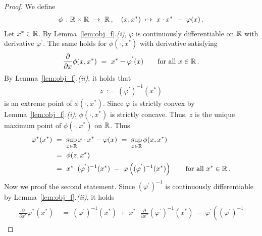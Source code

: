 \begin{proof}
We define
\begin{gather*}
 \phi
 \ 
 \colon
 \R
 \times
 \R
 \ 
 \to
 \ 
 \R
 \,,
 \quad
 (x,x^*)
 \ 
 \mapsto
 \ 
 x\cdot x^*
 \ 
 -
 \ 
 \varphi(x)
 \,.
\end{gather*}
Let $x^*\in\mathbb{R}$.
By Lemma~\ref{lem:obj_f}.\textit{(i)},
      $\varphi$ is continuously differentiable on $\mathbb{R}$ with derivative $\varphi^{'}$.
      The same holds for $\phi(\cdot,x^*)$ with derivative
      satisfying 
      \begin{gather*}
        \frac{\partial}{\partial x}
        \phi(x,x^*)
        \ 
        =
 \ 
        x^*
        -
        \varphi^{'}(x)
        \qquad
        \text{for all}\ 
        x\in\R
        \,.
      \end{gather*}
      By Lemma~\ref{lem:obj_f}.\textit{(ii)},
  it holds that 
  \begin{gather*}
    z
    \ 
    :=
    \ 
      (
    \varphi^{'}
    )^{-1}
    (x^*)
  \end{gather*}
  is an extreme point of $\phi(\cdot,x^*)$.
  Since $\varphi$ is strictly convex by Lemma~\ref{lem:obj_f}.\textit{(i)}, 
  $\phi(\cdot,x^*)$
  is strictly concave. 
  Thus,
  $z$ is the unique maximum point
  of
  $\phi(\cdot,x^*)$
  on $\mathbb{R}$.
  Thus
  \begin{align*}
    \varphi^*(x^*)
    &
    \ 
    =
    \ 
    \sup_{x\in\R}
    x\cdot x^* - \varphi(x)
    \ 
    =
    \ 
    \sup_{x\in\R}
    \phi(x,x^*)
    \\
    &
    \ 
    =
    \ 
    \phi(z,x^*)
    \\
    &
    \ 
    =
    \ 
    x^*
    \!
    \cdot
    (
    \varphi^{'}
    )^{-1}
    (x^*)
    \ 
    -
    \ 
    \varphi
    \left( 
      (
    \varphi^{'}
    )^{-1}
    (x^*)
    \right)
    \qquad 
    \text{for all}\ 
    x^*\in\R
    \,.
  \end{align*}
  Now we proof the second statement.
  Since
  $
      (
    \varphi^{'}
    )^{-1}
  $
  is continuously differentiable by Lemma~\ref{lem:obj_f}.\textit{(ii)}, it holds
  \begin{align}
    \label{0098}
    \begin{split}
    \frac{\partial}{\partial x^*}
     \varphi^*(x^*)
    &
    \ 
    =
    \ 
    (
    \varphi^{'}
    )^{-1}
    (x^*)
    \ 
    +
    \ 
    x^*
    \!
    \cdot
    \frac{\partial}{\partial x^*}
    (
    \varphi^{'}
    )^{-1}
    (x^*)
    \ 
    -
    \ 
    \varphi^{'}
    \left( 
      (
    \varphi^{'}
    )^{-1}

\end{split}
\end{align}
\end{proof}
